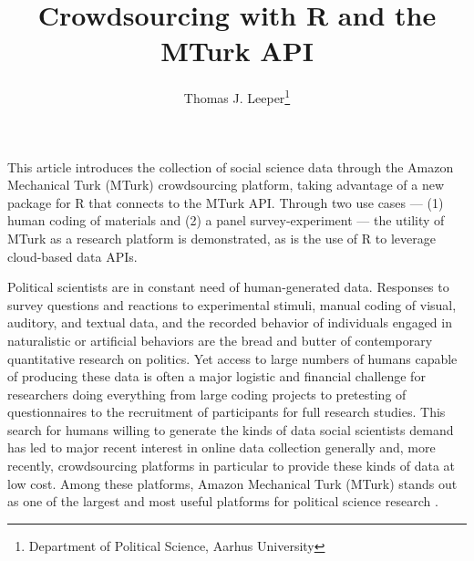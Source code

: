 \documentclass[11pt]{article}
\title{Crowdsourcing with R and the MTurk API}
\author{Thomas J. Leeper\thanks{Department of Political Science, Aarhus University}}
\begin{document}
\maketitle

{\abstract This article introduces the collection of social science data through the Amazon Mechanical Turk (MTurk) crowdsourcing platform, taking advantage of a new package for R that connects to the MTurk API. Through two use cases --- (1) human coding of materials and (2) a panel survey-experiment --- the utility of MTurk as a research platform is demonstrated, as is the use of R to leverage cloud-based data APIs.}

\singlespacing

Political scientists are in constant need of human-generated data. Responses to survey questions and reactions to experimental stimuli, manual coding of visual, auditory, and textual data, and the recorded behavior of individuals engaged in naturalistic or artificial behaviors are the bread and butter of contemporary quantitative research on politics. Yet access to large numbers of humans capable of producing these data is often a major logistic and financial challenge for researchers doing everything from large coding projects to pretesting of questionnaires to the recruitment of participants for full research studies. This search for humans willing to generate the kinds of data social scientists demand has led to major recent interest in online data collection generally \citep[e.g.,][]{Iyengar2010, IyengarVavreck2011, VavreckIyengar2011} and, more recently, crowdsourcing platforms in particular \citep{Schmidt2010, ChenMenezesBradley2011} to provide these kinds of data at low cost. Among these platforms, Amazon Mechanical Turk (MTurk) stands out as one of the largest and most useful platforms for political science research \citep{BerinskyHuberLenz2010}.%
\end{document}
